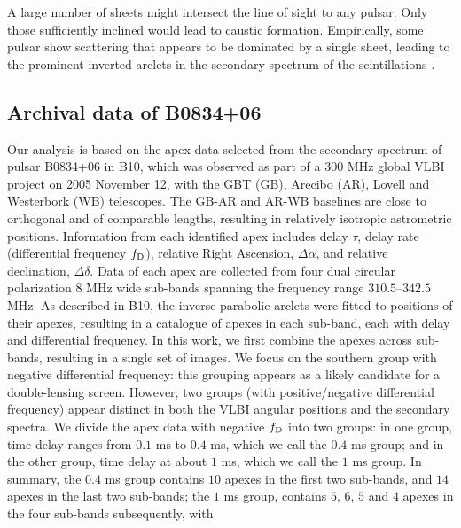 \documentclass[useAMS,usenatbib]{mn2e}
\begin{document}
A large number of sheets might intersect the line of sight to any
pulsar. Only those sufficiently inclined would lead to caustic
formation. Empirically, some pulsar show scattering that appears to be dominated by a
single sheet, leading to the prominent inverted
arclets in the secondary spectrum of the scintillations \citep{2001ApJ...549L..97S}.

\subsection{Archival data of B0834+06}
\label{21}
Our analysis is based on the apex data selected from the secondary
spectrum of pulsar B0834+06 in B10, which was
observed as part of a 300 MHz global VLBI project on 2005 November 12, with
the GBT (GB), Arecibo (AR), Lovell and Westerbork (WB) telescopes.  The GB-AR and AR-WB
baselines are close to orthogonal and of comparable lengths, resulting
in relatively isotropic astrometric positions.
Information from each identified apex includes delay $\tau$,
delay rate (differential frequency $f_{\rm D}$), relative Right Ascension,
$\Delta\alpha$, and relative declination, $\Delta\delta$.
Data of each apex are collected from four dual circular polarization $8$ MHz wide sub-bands spanning the frequency range $310.5$--$342.5$ MHz. 
As described in B10, the inverse parabolic
arclets were fitted to positions of their apexes, resulting in a
catalogue of apexes in each sub-band, each with delay and differential
frequency.  
In this work, we first combine the
apexes across sub-bands, resulting in a single set of images.  We focus on
the southern group with negative differential frequency: this
grouping appears as a likely candidate for a double-lensing screen. However, two groups (with positive/negative differential frequency) appear distinct in both the VLBI angular positions and the secondary spectra. We divide the apex data with negative $f_{\rm D}$ into two
groups: in one group, time delay ranges from $0.1$ ms to $0.4$ ms,
which we call the $0.4$ ms group; and in the other group, time delay at
about $1$ ms, which we call the $1$ ms group.  In summary, the
$0.4$ ms group contains $10$ apexes in the first two sub-bands, and
$14$ apexes in the last two sub-bands; the $1$ ms group, contains $5$,
$6$, $5$ and $4$ apexes in the four sub-bands subsequently, with
\end{document}

